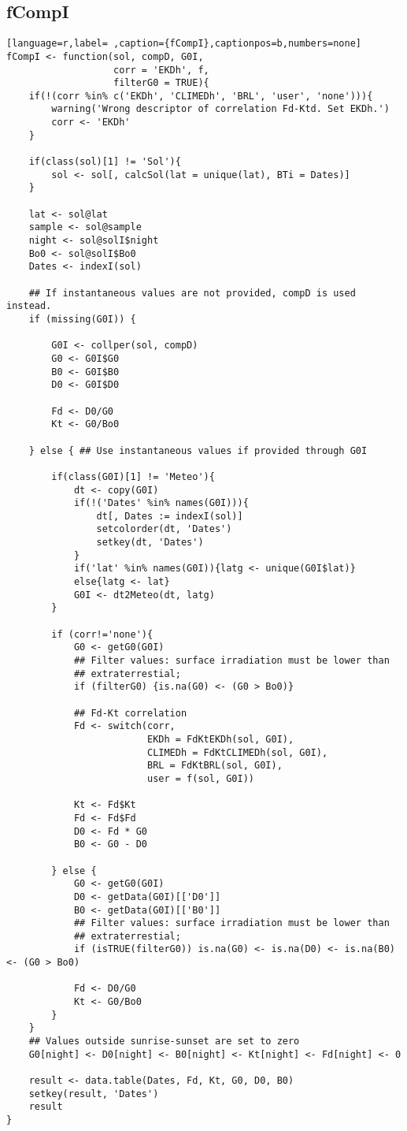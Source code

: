 \subsection{fCompI}
\label{sec:orgc2c5511}
\label{subsec:fcompi}
\begin{lstlisting}[language=r,label= ,caption={fCompI},captionpos=b,numbers=none]
fCompI <- function(sol, compD, G0I,
                   corr = 'EKDh', f,
                   filterG0 = TRUE){
    if(!(corr %in% c('EKDh', 'CLIMEDh', 'BRL', 'user', 'none'))){
        warning('Wrong descriptor of correlation Fd-Ktd. Set EKDh.')
        corr <- 'EKDh'
    }

    if(class(sol)[1] != 'Sol'){
        sol <- sol[, calcSol(lat = unique(lat), BTi = Dates)]
    }

    lat <- sol@lat
    sample <- sol@sample
    night <- sol@solI$night
    Bo0 <- sol@solI$Bo0
    Dates <- indexI(sol)

    ## If instantaneous values are not provided, compD is used instead.
    if (missing(G0I)) { 

        G0I <- collper(sol, compD)
        G0 <- G0I$G0
        B0 <- G0I$B0
        D0 <- G0I$D0

        Fd <- D0/G0
        Kt <- G0/Bo0

    } else { ## Use instantaneous values if provided through G0I

        if(class(G0I)[1] != 'Meteo'){
            dt <- copy(G0I)
            if(!('Dates' %in% names(G0I))){
                dt[, Dates := indexI(sol)]
                setcolorder(dt, 'Dates')
                setkey(dt, 'Dates')
            }
            if('lat' %in% names(G0I)){latg <- unique(G0I$lat)}
            else{latg <- lat}
            G0I <- dt2Meteo(dt, latg)
        }

        if (corr!='none'){
            G0 <- getG0(G0I)
            ## Filter values: surface irradiation must be lower than
            ## extraterrestial; 
            if (filterG0) {is.na(G0) <- (G0 > Bo0)}

            ## Fd-Kt correlation
            Fd <- switch(corr,
                         EKDh = FdKtEKDh(sol, G0I),
                         CLIMEDh = FdKtCLIMEDh(sol, G0I),
                         BRL = FdKtBRL(sol, G0I), 
                         user = f(sol, G0I))

            Kt <- Fd$Kt
            Fd <- Fd$Fd
            D0 <- Fd * G0
            B0 <- G0 - D0

        } else { 
            G0 <- getG0(G0I)
            D0 <- getData(G0I)[['D0']]
            B0 <- getData(G0I)[['B0']]
            ## Filter values: surface irradiation must be lower than
            ## extraterrestial; 
            if (isTRUE(filterG0)) is.na(G0) <- is.na(D0) <- is.na(B0) <- (G0 > Bo0)

            Fd <- D0/G0
            Kt <- G0/Bo0
        }
    }
    ## Values outside sunrise-sunset are set to zero
    G0[night] <- D0[night] <- B0[night] <- Kt[night] <- Fd[night] <- 0

    result <- data.table(Dates, Fd, Kt, G0, D0, B0)
    setkey(result, 'Dates')
    result
}
\end{lstlisting}
